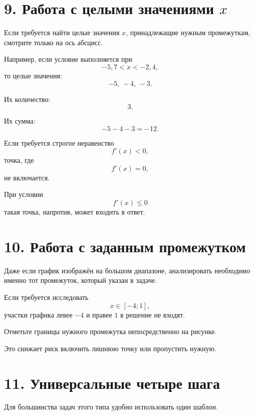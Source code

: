 \documentclass[a4paper,12pt]{article}
\begin{document}
\section*{9. Работа с целыми значениями \(x\)}

Если требуется найти целые значения \(x\), принадлежащие нужным промежуткам, смотрите только на ось абсцисс.

Например, если условие выполняется при
\[
-5{,}7<x<-2{,}4,
\]
то целые значения:
\[
-5,\,-4,\,-3.
\]

Их количество:
\[
3.
\]

Их сумма:
\[
-5-4-3=-12.
\]

\begin{errorbox}
Если требуется строгое неравенство
\[
f'(x)<0,
\]
точка, где
\[
f'(x)=0,
\]
не включается.

При условии
\[
f'(x)\le 0
\]
такая точка, напротив, может входить в ответ.
\end{errorbox}

\section*{10. Работа с заданным промежутком}

Даже если график изображён на большом диапазоне, анализировать необходимо именно тот промежуток, который указан в задаче.

Если требуется исследовать
\[
x\in[-4;1],
\]
участки графика левее \(-4\) и правее \(1\) в решение не входят.

\begin{noticebox}
Отметьте границы нужного промежутка непосредственно на рисунке.

Это снижает риск включить лишнюю точку или пропустить нужную.
\end{noticebox}

\section*{11. Универсальные четыре шага}

Для большинства задач этого типа удобно использовать один шаблон.
\end{document}
